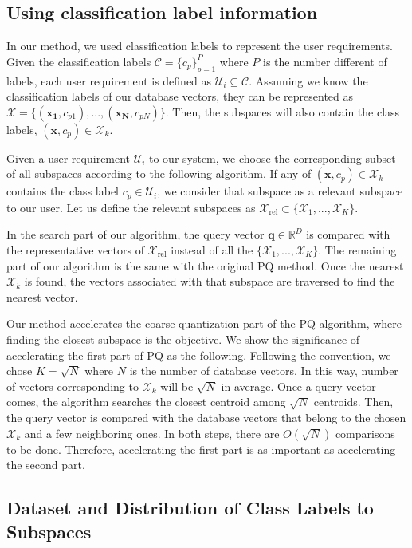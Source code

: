 \subsection{Using classification label information}

In our method, we used classification labels to represent the user requirements. 
Given the classification labels $\mathcal{C} = \{c_p\}_{p=1}^P$ where $P$ is the number different of labels, each user requirement is defined as $\mathcal{U}_i \subseteq \mathcal{C}$. 
Assuming we know the classification labels of our database vectors, they can be represented as $\mathcal{X} = \{(\bm{x_1}, c_{p1}), ..., (\bm{x_N}, c_{pN})\}$.
Then, the subspaces will also contain the class labels, $(\bm{x}, c_p) \in \mathcal{X}_k$.

Given a user requirement $\mathcal{U}_i$ to our system, we choose the corresponding subset of all subspaces according to the following algorithm.
If any of $(\bm{x}, c_p) \in \mathcal{X}_k$ contains the class label $c_p \in \mathcal{U}_i$, we consider that subspace as a relevant subspace to our user.
Let us define the relevant subspaces as $\mathcal{X}_\mathrm{rel} \subset \{\mathcal{X}_1,...,\mathcal{X}_K\}$.

In the search part of our algorithm, the query vector $\bm{q} \in \mathbb{R}^D$ is compared with the representative vectors of $\mathcal{X}_\mathrm{rel}$ instead of all the $\{\mathcal{X}_1,...,\mathcal{X}_K\}$. 
The remaining part of our algorithm is the same with the original PQ method.
Once the nearest $\mathcal{X}_k$ is found, the vectors associated with that subspace are traversed to find the nearest vector.

Our method accelerates the coarse quantization part of the PQ algorithm, where finding the closest subspace is the objective. 
We show the significance of accelerating the first part of PQ as the following.
Following the convention, we chose $K=\sqrt{N}$ where $N$ is the number of database vectors. 
In this way, number of vectors corresponding to $\mathcal{X}_k$ will be $\sqrt{N}$ in average. 
Once a query vector comes, the algorithm searches the closest centroid among $\sqrt{N}$ centroids. 
Then, the query vector is compared with the database vectors that belong to the chosen $\mathcal{X}_k$ and a few neighboring ones. 
In both steps, there are $O(\sqrt{N})$ comparisons to be done. 
Therefore, accelerating the first part is as important as accelerating the second part.

\subsection{Dataset and Distribution of Class Labels to Subspaces}
\label{retrievallabelinfo}

